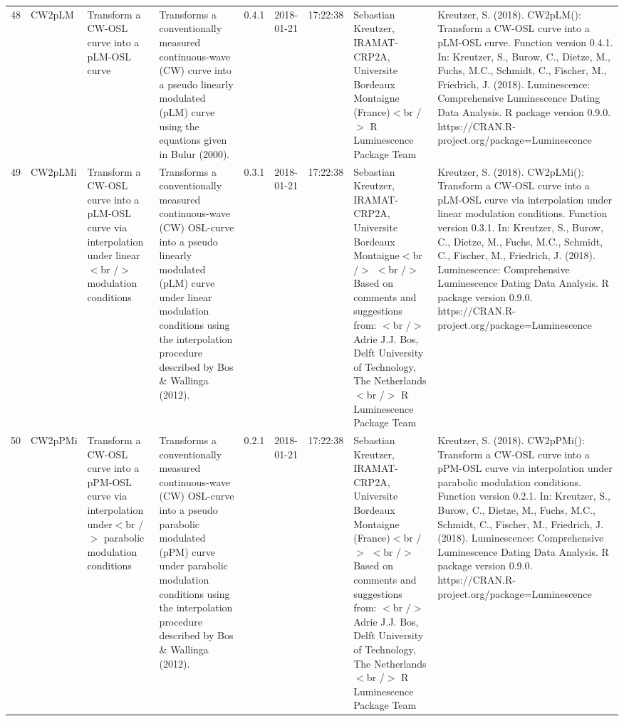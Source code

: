 \begin{table}[ht]
\begin{tabular}{rllllllll}
 \\ 
  48 & CW2pLM & Transform a CW-OSL curve into a pLM-OSL curve & Transforms a conventionally measured continuous-wave (CW) curve into a pseudo linearly modulated (pLM) curve using the equations given in Bulur (2000). & 0.4.1 & 2018-01-21 & 17:22:38
 & Sebastian Kreutzer, IRAMAT-CRP2A, Universite Bordeaux Montaigne (France)$<$br /$>$  R Luminescence Package Team & Kreutzer, S. (2018). CW2pLM(): Transform a CW-OSL curve into a pLM-OSL curve. Function version 0.4.1. In: Kreutzer, S., Burow, C., Dietze, M., Fuchs, M.C., Schmidt, C., Fischer, M., Friedrich, J. (2018). Luminescence: Comprehensive Luminescence Dating Data Analysis. R package version 0.9.0. https://CRAN.R-project.org/package=Luminescence
 \\ 
  49 & CW2pLMi & Transform a CW-OSL curve into a pLM-OSL curve via interpolation under linear$<$br /$>$ modulation conditions & Transforms a conventionally measured continuous-wave (CW) OSL-curve into a pseudo linearly modulated (pLM) curve under linear modulation conditions using the interpolation procedure described by Bos \& Wallinga (2012). & 0.3.1 & 2018-01-21 & 17:22:38
 & Sebastian Kreutzer, IRAMAT-CRP2A, Universite Bordeaux Montaigne$<$br /$>$ $<$br /$>$ Based on comments and suggestions from: $<$br /$>$ Adrie J.J. Bos, Delft University of Technology, The Netherlands$<$br /$>$  R Luminescence Package Team & Kreutzer, S. (2018). CW2pLMi(): Transform a CW-OSL curve into a pLM-OSL curve via interpolation under linear modulation conditions. Function version 0.3.1. In: Kreutzer, S., Burow, C., Dietze, M., Fuchs, M.C., Schmidt, C., Fischer, M., Friedrich, J. (2018). Luminescence: Comprehensive Luminescence Dating Data Analysis. R package version 0.9.0. https://CRAN.R-project.org/package=Luminescence
 \\ 
  50 & CW2pPMi & Transform a CW-OSL curve into a pPM-OSL curve via interpolation under$<$br /$>$ parabolic modulation conditions & Transforms a conventionally measured continuous-wave (CW) OSL-curve into a pseudo parabolic modulated (pPM) curve under parabolic modulation conditions using the interpolation procedure described by Bos \& Wallinga (2012). & 0.2.1 & 2018-01-21 & 17:22:38
 & Sebastian Kreutzer, IRAMAT-CRP2A, Universite Bordeaux Montaigne (France)$<$br /$>$ $<$br /$>$ Based on comments and suggestions from: $<$br /$>$ Adrie J.J. Bos, Delft University of Technology, The Netherlands$<$br /$>$  R Luminescence Package Team & Kreutzer, S. (2018). CW2pPMi(): Transform a CW-OSL curve into a pPM-OSL curve via interpolation under parabolic modulation conditions. Function version 0.2.1. In: Kreutzer, S., Burow, C., Dietze, M., Fuchs, M.C., Schmidt, C., Fischer, M., Friedrich, J. (2018). Luminescence: Comprehensive Luminescence Dating Data Analysis. R package version 0.9.0. https://CRAN.R-project.org/package=Luminescence

\end{tabular}
\end{table}
